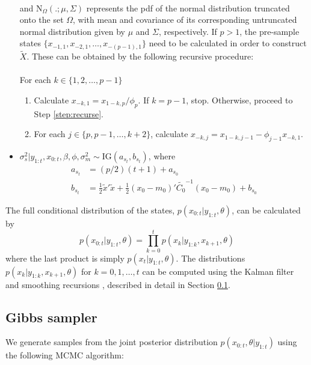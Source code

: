 \documentclass{article}
\begin{document}
\begin{itemize}
\begin{align*}
\end{align*}
\noindent and $\mbox{N}_{\Omega}(.;\mu,\Sigma)$ represents the pdf of the normal distribution truncated onto the set $\Omega$, with mean and covariance of its corresponding untruncated normal distribution given by $\mu$ and $\Sigma$, respectively. If $p > 1$, the pre-sample states $\{x_{-1,1}, x_{-2,1}, \ldots, x_{-(p-1),1}\}$ need to be calculated in order to construct $\tilde{X}$. These can be obtained by the following recursive procedure: \\
\\
For each $k \in \{1,2,\ldots,p-1\}$
\begin{enumerate}
\item Calculate $x_{-k,1} = x_{1-k,p} / \phi_p$. If $k = p - 1$, stop. Otherwise, proceed to Step \ref{step:recurse}.
\item For each $j \in \{p,p-1,\ldots,k+2\}$, calculate $x_{-k,j} = x_{1-k,j-1} - \phi_{j-1}x_{-k,1}$. \label{step:recurse}
\end{enumerate}
\item $\sigma^2_s|y_{1:t},x_{0:t},\beta,\phi,\sigma^2_m \sim \mbox{IG}(a_{s_t}, b_{s_t})$, where
\begin{align*}
a_{s_t} &= (p/2)(t+1) + a_{s_0} \\
b_{s_t} &= \frac{1}{2}\tilde{x}'\tilde{x} + \frac{1}{2}(x_0-m_0)'\tilde{C_0}^{-1}(x_0-m_0) + b_{s_0}
\end{align*}
\end{itemize}

The full conditional distribution of the states, $p(x_{0:t}|y_{1:t},\theta)$, can be calculated by
\[p(x_{0:t}|y_{1:t},\theta) = \prod_{k=0}^t p(x_k|y_{1:k},x_{k+1},\theta)\]
where the last product is simply $p(x_t|y_{1:t},\theta)$. The distributions $p(x_k|y_{1:k},x_{k+1},\theta)$ for $k = 0,1,\ldots,t$ can be computed using the Kalman filter and smoothing recursions \citep{petris2009dynamic}, described in detail in Section \ref{sec:gibbs}.

\subsection{Gibbs sampler} \label{sec:gibbs}

We generate samples from the joint posterior distribution $p(x_{0:t},\theta|y_{1:t})$ using the following MCMC algorithm:
\end{document}
